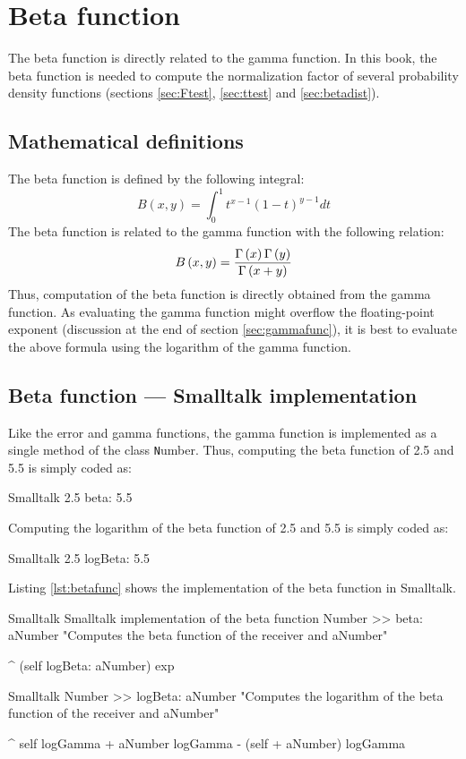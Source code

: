 \section{Beta function}
\label{sec:betafunc} The beta function is directly related to the
gamma function. In this book, the beta function is needed to
compute the normalization factor of several probability density
functions (\cf sections \ref{sec:Ftest}, \ref{sec:ttest} and
\ref{sec:betadist}).
\subsection{Mathematical definitions}
The beta function is defined by the following integral:
\begin{equation}
\label{eq:betaint} B\left(x,y\right)=\int_0^1
t^{x-1}\left(1-t\right)^{y-1}dt
\end{equation}
The beta function is related to the gamma function with the
following relation:
\begin{equation}
B\left(x,y\right)={\Gamma\left(x\right)\Gamma\left(y\right)\over\Gamma\left(x+y\right)}
\end{equation}
Thus, computation of the beta function is directly obtained from
the gamma function.
As evaluating the gamma function might
overflow the floating-point exponent (\cf discussion at the end of
section \ref{sec:gammafunc}), it is best to evaluate the above
formula using the logarithm of the gamma function.

\subsection{Beta function --- Smalltalk implementation}
 Like the error and gamma functions, the
gamma function is implemented as a single method of the class {\texttt
  Number}.
Thus, computing the beta function of 2.5 and 5.5 is simply coded as:
\begin{displaycode}{Smalltalk}
2.5 beta: 5.5
\end{displaycode}

Computing the logarithm of the beta function of
2.5 and 5.5 is simply coded as:
\begin{displaycode}{Smalltalk}
2.5 logBeta: 5.5
\end{displaycode}
Listing \ref{lst:betafunc} shows the implementation of the beta function in Smalltalk.

\begin{listing}[label=lst:betafunc]{Smalltalk}
  {Smalltalk implementation of the beta function}
Number >> beta: aNumber
   "Computes the beta function of the receiver and aNumber"

   ^ (self logBeta: aNumber) exp
\end{listing}

\begin{displaycode}{Smalltalk}
Number >> logBeta: aNumber
   "Computes the logarithm of the beta function of the receiver and aNumber"

   ^ self logGamma + aNumber logGamma - (self + aNumber) logGamma
\end{displaycode}


